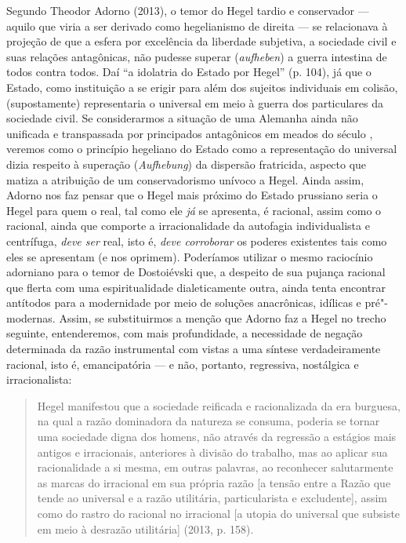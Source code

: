 Segundo Theodor Adorno (2013), o temor do Hegel tardio e conservador ---
aquilo que viria a ser derivado como hegelianismo de direita --- se
relacionava à projeção de que a esfera por excelência da liberdade
subjetiva, a sociedade civil e suas relações antagônicas, não pudesse
superar (\emph{aufheben}) a guerra intestina de todos contra todos. Daí
``a idolatria do Estado por Hegel'' (p. 104), já que o Estado, como
instituição a se erigir para além dos sujeitos individuais em colisão,
(supostamente) representaria o universal em meio à guerra dos
particulares da sociedade civil. Se considerarmos a situação de uma
Alemanha ainda não unificada e transpassada por principados antagônicos
em meados do século , veremos como o princípio hegeliano do Estado
como a representação do universal dizia respeito à superação
(\emph{Aufhebung}) da dispersão fratricida, aspecto que matiza a
atribuição de um conservadorismo unívoco a Hegel. Ainda assim, Adorno
nos faz pensar que o Hegel mais próximo do Estado prussiano seria o
Hegel para quem o real, tal como ele \emph{já} se apresenta, é racional,
assim como o racional, ainda que comporte a irracionalidade da autofagia
individualista e centrífuga, \emph{deve ser} real, isto é, \emph{deve
corroborar} os poderes existentes tais como eles se apresentam (e nos
oprimem). Poderíamos utilizar o mesmo raciocínio adorniano para o temor
de Dostoiévski que, a despeito de sua pujança racional que flerta com
uma espiritualidade dialeticamente outra, ainda tenta encontrar
antítodos para a modernidade por meio de soluções anacrônicas, idílicas
e pré"-modernas. Assim, se substituirmos a menção que Adorno faz a Hegel
no trecho seguinte, entenderemos, com mais profundidade, a necessidade
de negação determinada da razão instrumental com vistas a uma síntese
verdadeiramente racional, isto é, emancipatória --- e não, portanto,
regressiva, nostálgica e irracionalista:

\begin{quote}
Hegel manifestou que a sociedade reificada e racionalizada da era
burguesa, na qual a razão dominadora da natureza se consuma, poderia se
tornar uma sociedade digna dos homens, não através da regressão a
estágios mais antigos e irracionais, anteriores à divisão do trabalho,
mas ao aplicar sua racionalidade a si mesma, em outras palavras, ao
reconhecer salutarmente as marcas do irracional em sua própria razão
{[}a tensão entre a Razão que tende ao universal e a razão utilitária,
particularista e excludente{]}, assim como do rastro do racional no
irracional {[}a utopia do universal que subsiste em meio à desrazão
utilitária{]} (2013, p. 158).
\end{quote}

